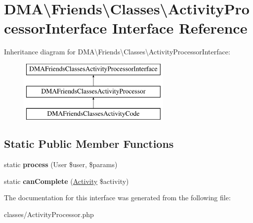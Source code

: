 \hypertarget{interfaceDMA_1_1Friends_1_1Classes_1_1ActivityProcessorInterface}{\section{D\+M\+A\textbackslash{}Friends\textbackslash{}Classes\textbackslash{}Activity\+Processor\+Interface Interface Reference}
\label{interfaceDMA_1_1Friends_1_1Classes_1_1ActivityProcessorInterface}
}
Inheritance diagram for D\+M\+A\textbackslash{}Friends\textbackslash{}Classes\textbackslash{}Activity\+Processor\+Interface\+:\begin{figure}[H]
\begin{center}
\leavevmode
\includegraphics[height=3.000000cm]{d5/de2/interfaceDMA_1_1Friends_1_1Classes_1_1ActivityProcessorInterface}
\end{center}
\end{figure}
\subsection*{Static Public Member Functions}
\begin{DoxyCompactItemize}
\item 
\hypertarget{interfaceDMA_1_1Friends_1_1Classes_1_1ActivityProcessorInterface_a409b8e2e66125557cdd1adcceb26318e}{static {\bfseries process} (User \$user, \$params)}\label{interfaceDMA_1_1Friends_1_1Classes_1_1ActivityProcessorInterface_a409b8e2e66125557cdd1adcceb26318e}

\item 
\hypertarget{interfaceDMA_1_1Friends_1_1Classes_1_1ActivityProcessorInterface_a554030462c01bd8facec5e24c0d2d5bf}{static {\bfseries can\+Complete} (\hyperlink{classDMA_1_1Friends_1_1Models_1_1Activity}{Activity} \$activity)}\label{interfaceDMA_1_1Friends_1_1Classes_1_1ActivityProcessorInterface_a554030462c01bd8facec5e24c0d2d5bf}

\end{DoxyCompactItemize}


The documentation for this interface was generated from the following file\+:\begin{DoxyCompactItemize}
\item 
classes/Activity\+Processor.\+php\end{DoxyCompactItemize}
